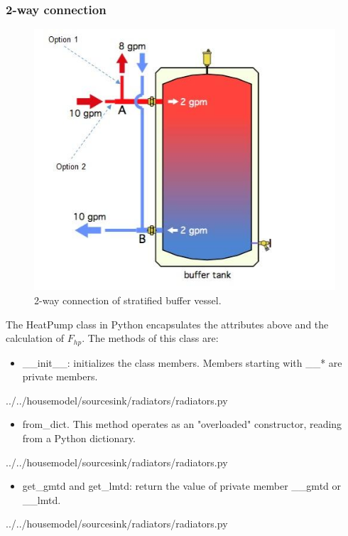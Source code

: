 \subsubsection{2-way connection}

\begin{figure}[H]
	\centering
	\includegraphics[width=0.5\columnwidth]{Figures/2-way buffer connection}
	\caption[Short title]{2-way connection of stratified buffer vessel.}
	\label{fig:2way}
\end{figure} 


The \textsf{HeatPump} class in Python encapsulates the attributes above and the calculation of $F_{hp}$. The methods of this class are:
\begin{itemize}
	\item \textsf{\_\_init\_\_}: initializes the class members. Members starting with \_\_* are private members.
\end{itemize}

 
{../../housemodel/sourcesink/radiators/radiators.py}

\begin{itemize}
	\item \textsf{from\_dict}. This method operates as an "overloaded" constructor, reading from a Python \textsf{dictionary}.
\end{itemize}

 
{../../housemodel/sourcesink/radiators/radiators.py}

\begin{itemize}
	\item \textsf{get\_gmtd} and \textsf{get\_lmtd}: return the value of private member \_\_gmtd or \_\_lmtd.
\end{itemize}

 
{../../housemodel/sourcesink/radiators/radiators.py}

